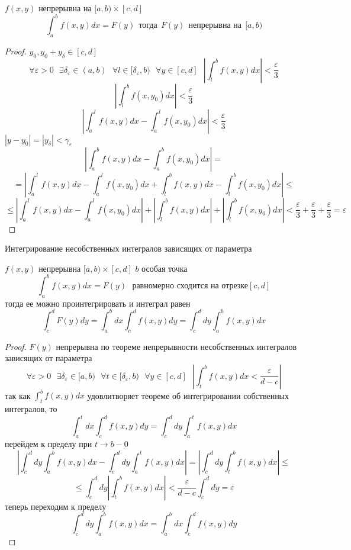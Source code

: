 \begin{theorem}
  $f(x,y)$ непрерывна на $[a,b) \times [c, d]$
  $$
  \int_a^b f(x,y) dx = F(y) ~~ \text{тогда} ~~ F(y) ~~ \text{непрерывна на} ~~
  [a,b)
  $$
\end{theorem}

\begin{proof}
  $y_0, y_0 + y_{\delta} \in [c, d]$
  $$
  \forall \varepsilon > 0
  ~~~
  \exists \delta_{\varepsilon} \in (a,b)
  ~~~
  \forall l \in [\delta_{\varepsilon}, b)
  ~~~
  \forall y \in [c, d]
  ~~~
  \left|
    \int_l^b f(x,y)dx
  \right|
  < \frac{\varepsilon}{3}
  $$
  $$
  \left|
    \int_l^b f(x,y_0)dx
  \right|
  < \frac{\varepsilon}{3}
  $$
  $$
  \left|
    \int_a^l f(x,y)dx
    -
    \int_a^l f(x,y_0)dx
  \right|
  < \frac{\varepsilon}{3}
  $$
  $|y - y_0| = |y_{\delta}| < \gamma_{\varepsilon}$
  $$
  \left|
    \int_a^b f(x,y)dx
    -
    \int_a^b f(x,y_0)dx
  \right|
  =
  $$
  $$
  =
  \left|
    \int_a^l f(x,y)dx
    -
    \int_a^l f(x,y_0)dx
    +
    \int_l^b f(x,y)dx
    -
    \int_l^b f(x,y_0)dx
  \right|
  \le
  $$
  $$
  \le
  \left|
    \int_a^l f(x,y)dx
    -
    \int_a^l f(x,y_0)dx
  \right|
  +
  \left|
    \int_l^b f(x,y)dx
  \right|
  +
  \left|
    \int_l^b f(x,y_0)dx
  \right|
  <
    \frac{\varepsilon}{3}
    +
    \frac{\varepsilon}{3}
    +
    \frac{\varepsilon}{3}
  =
    \varepsilon
  $$
\end{proof}

\begin{title}[\Large]
  Интегрирование несобственных интегралов зависящих от параметра
\end{title}

\begin{theorem}
  $f(x,y)$ непрерывна $[a,b) \times [c,d]$ $b$ особая точка
  $$
  \int_a^b f(x,y) dx = F(y) ~~~ \text{равномерно сходится на отрезке} [c,d]
  $$
  тогда ее можно проинтегрировать и интеграл равен
  $$
  \int_c^d F(y) dy = \int_a^b dx \int_c^d f(x,y) dy =
  \int_c^d dy \int_a^b f(x,y) dx
  $$
\end{theorem}

\begin{proof}
  $F(y)$ непрерывна по теореме непрерывности несобственных интегралов зависящих
  от параметра
  $$
  \forall \varepsilon > 0
  ~~~
  \exists \delta_{\varepsilon} \in [a, b)
  ~~~
  \forall t \in [\delta_{\varepsilon}, b)
  ~~~
  \forall y \in [c,d]
  ~~~
  \left|
    \int_t^b f(x,y) dx < \frac{\varepsilon}{d-c}
  \right|
  $$
  так как $\int_t^b f(x,y) dx$ удовлитворяет теореме об интегрировании
  собственных интегралов, то
  $$
  \int_a^t dx \int_c^d f(x,y) dy =
  \int_c^d dy \int_a^t f(x,y) dx
  $$
  перейдем к пределу при $t \to b -0$
  $$
  \left|
    \int_c^d dy \int_a^b f(x,y) dx
    -
    \int_c^d dy \int_a^t f(x,y) dx
  \right|
  =
  \left|
    \int_c^d dy \int_t^b f(x,y) dx
  \right|
  \le
  $$
  $$
  \le
  \int_c^d dy
  \left|
    \int_t^b f(x,y) dx
  \right|
  <
  \frac{\varepsilon}{d-c} \int_c^d dy = \varepsilon
  $$
  теперь переходим к пределу
  $$
  \int_c^d dy \int_a^b f(x,y) dx
  =
  \int_a^b dx \int_c^d f(x,y) dy
  $$
\end{proof}
